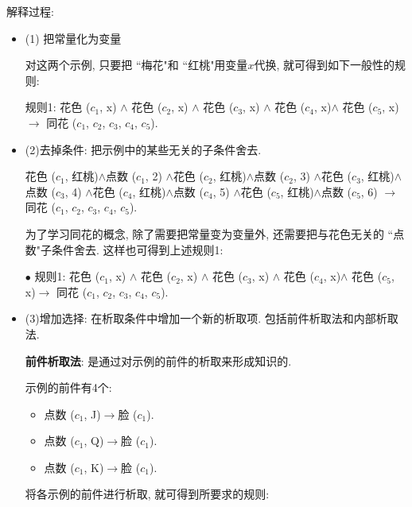 解释过程:
\begin{itemize}
\item (1) 把常量化为变量
\begin{example}
对这两个示例, 只要把 ``梅花"和 ``红桃"用变量$x$代换, 就可得到如下一般性的规则:

    规则1: 花色 ($c_1$, x) $\wedge$ 花色 ($c_2$, x) $\wedge$ 花色 ($c_3$, x) $\wedge$ 花色 ($c_4$, x)$\wedge$ 花色 ($c_5$, x)$\rightarrow$ 同花 ($c_1$, $c_2$, $c_3$, $c_4$, $c_5$).
\end{example}

\item (2)去掉条件: 把示例中的某些无关的子条件舍去.

\begin{example}
  花色 ($c_1$, 红桃)$\wedge$点数 ($c_1$, 2)
            $\wedge$花色 ($c_2$, 红桃)$\wedge$点数 ($c_2$, 3)
            $\wedge$花色 ($c_3$, 红桃)$\wedge$点数 ($c_3$, 4)
            $\wedge$花色 ($c_4$, 红桃)$\wedge$点数 ($c_4$, 5)
            $\wedge$花色 ($c_5$, 红桃)$\wedge$点数 ($c_5$, 6)
          $\rightarrow$ 同花 ($c_1$, $c_2$, $c_3$, $c_4$, $c_5$).
\end{example}

为了学习同花的概念, 除了需要把常量变为变量外, 还需要把与花色无关的 ``点数"子条件舍去. 这样也可得到上述规则1:

$\bullet$ 规则1: 花色 ($c_1$, x) $\wedge$ 花色 ($c_2$, x) $\wedge$ 花色 ($c_3$, x) $\wedge$ 花色 ($c_4$, x)$\wedge$ 花色 ($c_5$, x)$\rightarrow$ 同花 ($c_1$, $c_2$, $c_3$, $c_4$, $c_5$).

\item (3)增加选择: 在析取条件中增加一个新的析取项. 包括前件析取法和内部析取法.

 \textbf{前件析取法}: 是通过对示例的前件的析取来形成知识的.

\begin{example}\label{AIC7MLexam7.7}
示例的前件有4个:
\begin{itemize}
\item 点数 ($c_1$, J)$\rightarrow$脸 ($c_1$).
\item 点数 ($c_1$, Q)$\rightarrow$脸 ($c_1$).
\item 点数 ($c_1$, K)$\rightarrow$脸 ($c_1$).
\end{itemize}

将各示例的前件进行析取, 就可得到所要求的规则:


\end{example}
\end{itemize}
